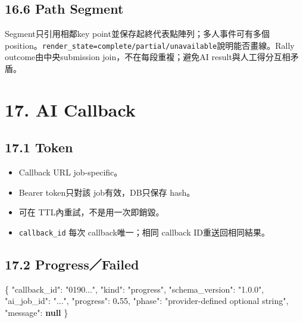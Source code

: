 \documentclass[
  9pt,
  a4paper,
]{article}
\newenvironment{Shaded}{}{}
\newcommand{\DataTypeTok}[1]{\textcolor[rgb]{0.56,0.13,0.00}{#1}}
\newcommand{\DecValTok}[1]{\textcolor[rgb]{0.25,0.63,0.44}{#1}}
\newcommand{\ErrorTok}[1]{\textcolor[rgb]{1.00,0.00,0.00}{\textbf{#1}}}
\newcommand{\FunctionTok}[1]{\textcolor[rgb]{0.02,0.16,0.49}{#1}}
\newcommand{\KeywordTok}[1]{\textcolor[rgb]{0.00,0.44,0.13}{\textbf{#1}}}
\newcommand{\StringTok}[1]{\textcolor[rgb]{0.25,0.44,0.63}{#1}}
\providecommand{\tightlist}{%
  \setlength{\itemsep}{0pt}\setlength{\parskip}{0pt}}
\begin{document}
\subsection{16.6 Path Segment}\label{166-path-segment}

Segment只引用相鄰key
point並保存起終代表點陣列；多人事件可有多個position。\texttt{render\_\allowbreak{}state=complete/partial/unavailable}說明能否畫線。Rally
outcome由中央submission join，不在每段重複；避免AI
result與人工得分互相矛盾。

\section{17. AI Callback}\label{17-ai-callback}

\subsection{17.1 Token}\label{171-token}

\begin{itemize}
\tightlist
\item
  Callback URL job-specific。
\item
  Bearer token只對該 job有效，DB只保存 hash。
\item
  可在 TTL內重試，不是用一次即銷毀。
\item
  \texttt{callback\_\allowbreak{}id} 每次 callback唯一；相同 callback
  ID重送回相同結果。
\end{itemize}

\subsection{17.2 Progress／Failed}\label{172-progressfailed}

\begin{Shaded}
\begin{Highlighting}[]
\FunctionTok{\{}
  \DataTypeTok{"callback\_\allowbreak{}id"}\FunctionTok{:} \StringTok{"0190..."}\FunctionTok{,}
  \DataTypeTok{"kind"}\FunctionTok{:} \StringTok{"progress"}\FunctionTok{,}
  \DataTypeTok{"schema\_\allowbreak{}version"}\FunctionTok{:} \StringTok{"1.0.0"}\FunctionTok{,}
  \DataTypeTok{"ai\_\allowbreak{}job\_\allowbreak{}id"}\FunctionTok{:} \StringTok{"..."}\FunctionTok{,}
  \DataTypeTok{"progress"}\FunctionTok{:} \DecValTok{0}\ErrorTok{.}\DecValTok{55}\FunctionTok{,}
  \DataTypeTok{"phase"}\FunctionTok{:} \StringTok{"provider{-}defined optional string"}\FunctionTok{,}
  \DataTypeTok{"message"}\FunctionTok{:} \KeywordTok{null}
\FunctionTok{\}}
\end{Highlighting}
\end{Shaded}
\end{document}
